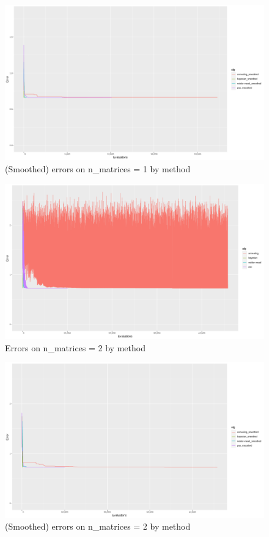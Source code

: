 \begin{figure}[!htb]
	\centering
	\includegraphics[width=\textwidth]{figures/n_1_smoothed}
	\decoRule
	\caption[n=1 (smoothed)]{(Smoothed) errors on n\_matrices = 1 by method}
	\label{fig:n_1_smoothed}
\end{figure}

\begin{figure}[!htb]
\centering
\includegraphics[width=\textwidth]{figures/n_2}
\decoRule
\caption[n=2]{Errors on n\_matrices = 2 by method}
\label{fig:n_2}
\end{figure}

\begin{figure}[!htb]
\centering
\includegraphics[width=\textwidth]{figures/n_2_smoothed}
\decoRule
\caption[n=2 (smoothed)]{(Smoothed) errors on n\_matrices = 2 by method}
\label{fig:n_2_smoothed}
\end{figure}

